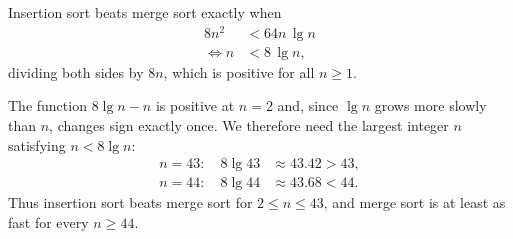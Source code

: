 Insertion sort beats merge sort exactly when
\begin{equation*}
  \begin{aligned}
    8n^2 &< 64n\, \lg{n} \\
    \Leftrightarrow n &< 8\, \lg{n},
  \end{aligned}
\end{equation*}
dividing both sides by $8n$, which is positive for all $n \geq 1$.

The function $8\lg{n} - n$ is positive at $n = 2$ and, since $\lg{n}$ grows more
slowly than $n$, changes sign exactly once. We therefore need the largest
integer $n$ satisfying $n < 8\lg{n}$:
\begin{equation*}
  \begin{aligned}
    n = 43: \quad 8\lg{43} &\approx 43.42 > 43, \\
    n = 44: \quad 8\lg{44} &\approx 43.68 < 44.
  \end{aligned}
\end{equation*}
Thus insertion sort beats merge sort for $2 \leq n \leq 43$, and merge sort is
at least as fast for every $n \geq 44$.
